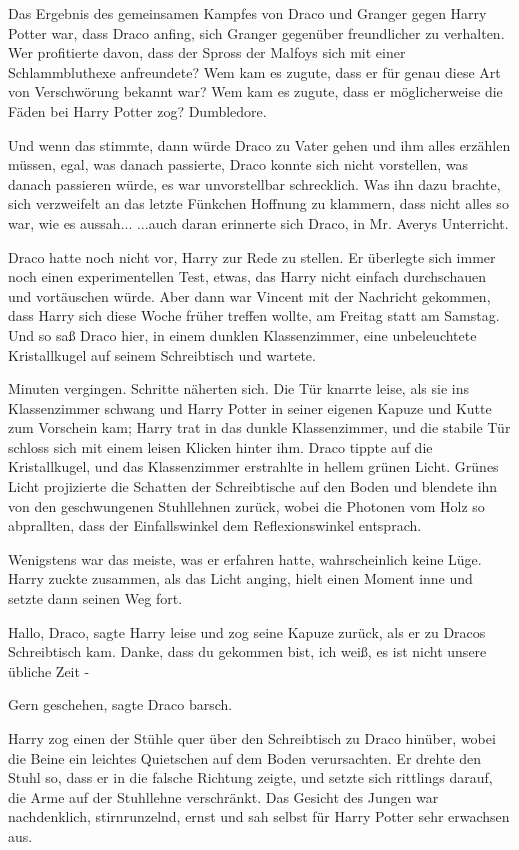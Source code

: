Das Ergebnis des gemeinsamen Kampfes von Draco und Granger gegen Harry Potter
war, dass Draco anfing, sich Granger gegenüber freundlicher zu verhalten. Wer
profitierte davon, dass der Spross der Malfoys sich mit einer Schlammbluthexe
anfreundete? Wem kam es zugute, dass er für genau diese Art von Verschwörung
bekannt war? Wem kam es zugute, dass er möglicherweise die Fäden bei Harry
Potter zog? Dumbledore.

Und wenn das stimmte, dann würde Draco zu Vater gehen und ihm alles erzählen
müssen, egal, was danach passierte, Draco konnte sich nicht vorstellen, was
danach passieren würde, es war unvorstellbar schrecklich. Was ihn dazu brachte,
sich verzweifelt an das letzte Fünkchen Hoffnung zu klammern, dass nicht alles
so war, wie es aussah... ...auch daran erinnerte sich Draco, in Mr. Averys
Unterricht.

Draco hatte noch nicht vor, Harry zur Rede zu stellen. Er überlegte sich immer
noch einen experimentellen Test, etwas, das Harry nicht einfach durchschauen und
vortäuschen würde. Aber dann war Vincent mit der Nachricht gekommen, dass Harry
sich diese Woche früher treffen wollte, am Freitag statt am Samstag. Und so saß
Draco hier, in einem dunklen Klassenzimmer, eine unbeleuchtete Kristallkugel auf
seinem Schreibtisch und wartete.

Minuten vergingen. Schritte näherten sich. Die Tür knarrte leise, als sie ins
Klassenzimmer schwang und Harry Potter in seiner eigenen Kapuze und Kutte zum
Vorschein kam; Harry trat in das dunkle Klassenzimmer, und die stabile Tür
schloss sich mit einem leisen Klicken hinter ihm. Draco tippte auf die
Kristallkugel, und das Klassenzimmer erstrahlte in hellem grünen Licht. Grünes
Licht projizierte die Schatten der Schreibtische auf den Boden und blendete ihn
von den geschwungenen Stuhllehnen zurück, wobei die Photonen vom Holz so
abprallten, dass der Einfallswinkel dem Reflexionswinkel entsprach.

Wenigstens war das meiste, was er erfahren hatte, wahrscheinlich keine Lüge.
Harry zuckte zusammen, als das Licht anging, hielt einen Moment inne und setzte
dann seinen Weg fort.

\glqq Hallo, Draco\grqq{}, sagte Harry leise und zog seine Kapuze zurück, als er
zu Dracos Schreibtisch kam. \glqq Danke, dass du gekommen bist, ich weiß, es ist
nicht unsere übliche Zeit -\grqq{}

\glqq Gern geschehen\grqq{}, sagte Draco barsch.

Harry zog einen der Stühle quer über den Schreibtisch zu Draco hinüber, wobei
die Beine ein leichtes Quietschen auf dem Boden verursachten. Er drehte den
Stuhl so, dass er in die falsche Richtung zeigte, und setzte sich rittlings
darauf, die Arme auf der Stuhllehne verschränkt. Das Gesicht des Jungen war
nachdenklich, stirnrunzelnd, ernst und sah selbst für Harry Potter sehr
erwachsen aus.

